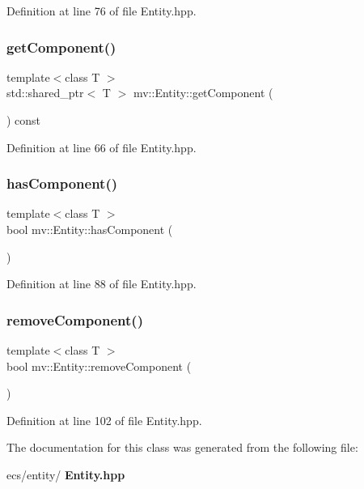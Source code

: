 Definition at line 76 of file Entity.\+hpp.

\mbox{\label{classmv_1_1_entity_a224021f1bce327d022f8737af68a0b31}} 
\subsubsection{get\+Component()}
{\footnotesize\ttfamily template$<$class T $>$ \\
std\+::shared\+\_\+ptr$<$ T $>$ mv\+::\+Entity\+::get\+Component (\begin{DoxyParamCaption}{ }\end{DoxyParamCaption}) const\hspace{0.3cm}{\ttfamily [inline]}}



Definition at line 66 of file Entity.\+hpp.

\mbox{\label{classmv_1_1_entity_a4e6de8eac6b6958aa2aab80aa18a10e9}} 
\subsubsection{has\+Component()}
{\footnotesize\ttfamily template$<$class T $>$ \\
bool mv\+::\+Entity\+::has\+Component (\begin{DoxyParamCaption}{ }\end{DoxyParamCaption})\hspace{0.3cm}{\ttfamily [inline]}}



Definition at line 88 of file Entity.\+hpp.

\mbox{\label{classmv_1_1_entity_ac71d37b52fd82a050e76e0f3e396ec4a}} 
\subsubsection{remove\+Component()}
{\footnotesize\ttfamily template$<$class T $>$ \\
bool mv\+::\+Entity\+::remove\+Component (\begin{DoxyParamCaption}{ }\end{DoxyParamCaption})\hspace{0.3cm}{\ttfamily [inline]}}



Definition at line 102 of file Entity.\+hpp.



The documentation for this class was generated from the following file\+:\begin{DoxyCompactItemize}
\item 
ecs/entity/\textbf{ Entity.\+hpp}\end{DoxyCompactItemize}

